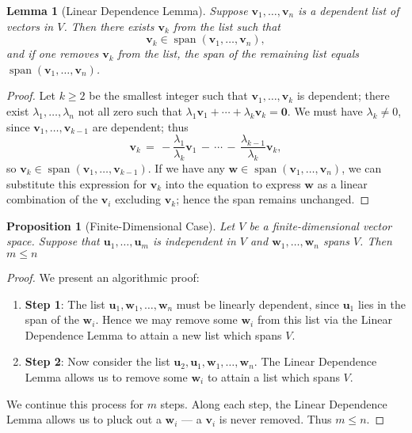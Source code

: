 \documentclass[11pt]{article}
\newtheorem{lemma}{Lemma}
\newtheorem{proposition}{Proposition}
\renewcommand{\vec}[1]{\mathbf{#1}}
\newcommand{\spn}{\operatorname{span}}
\begin{document}
\begin{adjustwidth}{0.5cm}{}
  \begin{lemma}[Linear Dependence Lemma]
    Suppose $\vec{v}_{1}, \ldots, \vec{v}_{n}$ is a dependent list of vectors in $V$. Then there exists $\vec{v}_{k}$ from the list such that
    \[
      \vec{v}_{k} \in \spn(\vec{v}_{1}, \ldots, \vec{v}_{n}),
    \]
    and if one removes $\vec{v}_{k}$ from the list, the span of the remaining list equals $\spn(\vec{v}_{1}, \ldots, \vec{v}_{n})$.
  \end{lemma}
  \begin{proof}
    Let $k \ge 2$ be the smallest integer such that $\vec{v}_{1}, \ldots, \vec{v}_{k}$ is dependent; there exist $\lambda_{1}, \ldots, \lambda_{n}$ not all zero such that $\lambda_{1} \vec{v}_{1} + \cdots + \lambda_{k} \vec{v}_{k} = \vec{0}$. We must have $\lambda_{k} \ne 0$, since $\vec{v}_{1}, \ldots, \vec{v}_{k - 1}$ are dependent; thus
    \[
      \vec{v}_{k} \, = \, - \frac{\lambda_{1}}{\lambda_{k}} \vec{v}_{1} \, - \, \cdots \, - \, \frac{\lambda_{k - 1}}{\lambda_{k}} \vec{v}_{k},
    \]
    so $\vec{v}_{k} \in \spn(\vec{v}_{1}, \ldots, \vec{v}_{k - 1})$. If we have any $\vec{w} \in \spn(\vec{v}_{1}, \ldots, \vec{v}_{n})$, we can substitute this expression for $\vec{v}_{k}$ into the equation to express $\vec{w}$ as a linear combination of the $\vec{v}_{i}$ excluding $\vec{v}_{k}$; hence the span remains unchanged.
  \end{proof}
\end{adjustwidth}

\begin{adjustwidth}{0.5cm}{}
  \begin{proposition}[Finite-Dimensional Case]
    Let $V$ be a finite-dimensional vector space. Suppose that $\vec{u}_{1}, \ldots, \vec{u}_{m}$ is independent in $V$ and $\vec{w}_{1}, \ldots, \vec{w}_{n}$ spans $V$. Then $m \le n$
  \end{proposition}
  \begin{proof}
    We present an algorithmic proof:
    \begin{enumerate}
      \item \textbf{Step 1}: The list $\vec{u}_{1}, \vec{w}_{1}, \ldots, \vec{w}_{n}$ must be linearly dependent, since $\vec{u}_{1}$ lies in the span of the $\vec{w}_{i}$. Hence we may remove some $\vec{w}_{i}$ from this list via the Linear Dependence Lemma to attain a new list which spans $V$.
      \item \textbf{Step 2}: Now consider the list $\vec{u}_{2}, \vec{u}_{1}, \vec{w}_{1}, \ldots, \vec{w}_{n}$. The Linear Dependence Lemma allows us to remove some $\vec{w}_{i}$ to attain a list which spans $V$.
    \end{enumerate}
    We continue this process for $m$ steps. Along each step, the Linear Dependence Lemma allows us to pluck out a $\vec{w}_{i}$ --- a $\vec{v}_{i}$ is never removed. Thus $m \le n$.
  \end{proof}
\end{adjustwidth}
\end{document}
